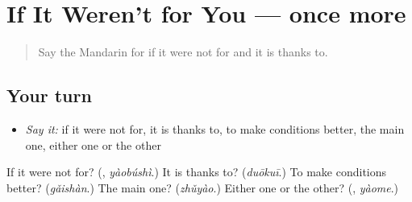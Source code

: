 \section[(dialogue)]{If It Weren't for You — once more}

\label{lesson:ZH-R541-review-final-541}



\begin{quote}
Say the Mandarin for if it were not for and it is thanks to.
\end{quote}

\subsection*{Your turn}
\begin{itemize}
\raggedright
  \item \emph{Say it:} if it were not for, it is thanks to, to make conditions better, the main one, either one or the other
\end{itemize}

\begin{tcolorbox}[breakable,colback=teal!4,colframe=teal!35!black,title={Before you move on}]
If it were not for? (\textbf{}, \emph{yàobúshì}.) It is thanks to? (\emph{duōkuī}.) To make conditions better? (\emph{gǎishàn}.) The main one? (\emph{zhǔyào}.) Either one or the other? (\textbf{}, \emph{yàome}.)
\end{tcolorbox}
